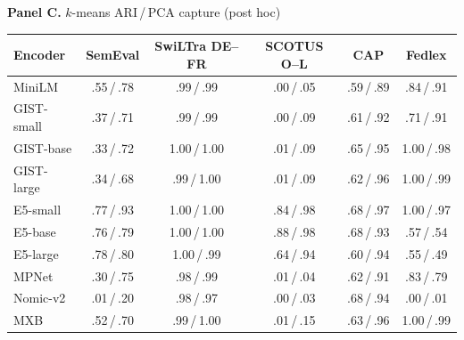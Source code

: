 \newpage
\par{\textbf{Panel C.} $k$-means ARI\,/\,PCA capture (post hoc)}\par\vspace{1pt}
\begin{tabular}{lccccc}
\toprule
Encoder & \multicolumn{1}{c}{SemEval} & \multicolumn{1}{c}{SwiLTra DE--FR} & \multicolumn{1}{c}{SCOTUS O--L} & \multicolumn{1}{c}{CAP} & \multicolumn{1}{c}{Fedlex} \\
\midrule
MiniLM & .55\,/\,.78 & .99\,/\,.99 & .00\,/\,.05 & .59\,/\,.89 & .84\,/\,.91 \\
\addlinespace[1pt]
GIST-small & .37\,/\,.71 & .99\,/\,.99 & .00\,/\,.09 & .61\,/\,.92 & .71\,/\,.91 \\
GIST-base & .33\,/\,.72 & 1.00\,/\,1.00 & .01\,/\,.09 & .65\,/\,.95 & 1.00\,/\,.98 \\
GIST-large & .34\,/\,.68 & .99\,/\,1.00 & .01\,/\,.09 & .62\,/\,.96 & 1.00\,/\,.99 \\
\addlinespace[1pt]
E5-small & .77\,/\,.93 & 1.00\,/\,1.00 & .84\,/\,.98 & .68\,/\,.97 & 1.00\,/\,.97 \\
E5-base & .76\,/\,.79 & 1.00\,/\,1.00 & .88\,/\,.98 & .68\,/\,.93 & .57\,/\,.54 \\
E5-large & .78\,/\,.80 & 1.00\,/\,.99 & .64\,/\,.94 & .60\,/\,.94 & .55\,/\,.49 \\
\addlinespace[1pt]
MPNet & .30\,/\,.75 & .98\,/\,.99 & .01\,/\,.04 & .62\,/\,.91 & .83\,/\,.79 \\
Nomic-v2 & .01\,/\,.20 & .98\,/\,.97 & .00\,/\,.03 & .68\,/\,.94 & .00\,/\,.01 \\
MXB & .52\,/\,.70 & .99\,/\,1.00 & .01\,/\,.15 & .63\,/\,.96 & 1.00\,/\,.99 \\
\bottomrule
\end{tabular}

\vspace{2pt}
\label{tab:ten-encoder-robustness}

\endgroup
